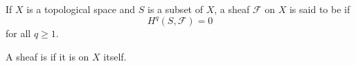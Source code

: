 \documentclass[12pt]{article}
\begin{document}
If $X$ is a topological space and $S$ is a subset of $X$, a sheaf $\mathcal F$ on $X$ is said to be  if
$$
H^q(S,\mathcal F)=0
$$
for all $q\ge 1$.

A sheaf is  if it is  on $X$ itself.
\end{document}
